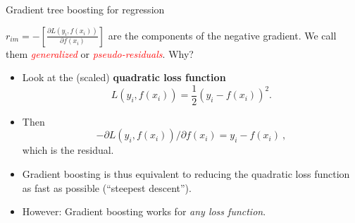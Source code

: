 \documentclass[
  10pt,
  ignorenonframetext,
]{beamer}
\providecommand{\tightlist}{%
  \setlength{\itemsep}{0pt}\setlength{\parskip}{0pt}}
\begin{document}
\begin{frame}
\begin{block}{Gradient tree boosting for regression}
\protect\hypertarget{gradient-tree-boosting-for-regression}{}
\(~\)

\(r_{im} = - \left[ \frac{\partial L(y_i,f(x_i))}{\partial f(x_i)} \right]\)
are the components of the negative gradient. We call them
\emph{\textcolor{red}{generalized}} or
\emph{\textcolor{red}{pseudo-residuals}}. Why?

\vspace{8mm}

\begin{itemize}
\tightlist
\item
  Look at the (scaled) \textbf{quadratic loss function}
  \[L(y_i,f(x_i)) = \frac{1}{2} (y_i-f(x_i))^2.\]
\end{itemize}

\vspace{2mm}

\begin{itemize}
\tightlist
\item
  Then \[-\partial L(y_i,f(x_i))/\partial f(x_i) = y_i - f(x_i) \ , \]
  which is the residual.
\end{itemize}

\vspace{2mm}

\begin{itemize}
\tightlist
\item
  Gradient boosting is thus equivalent to reducing the quadratic loss
  function as fast as possible (``steepest descent'').
\end{itemize}

\vspace{2mm}

\begin{itemize}
\tightlist
\item
  However: Gradient boosting works for \emph{any loss function}.
\end{itemize}
\end{block}
\end{frame}
\end{document}
